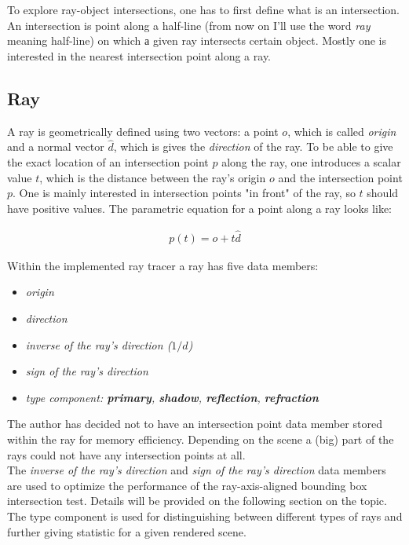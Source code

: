 \documentclass{article}
\begin{document}
\vspace*{\baselineskip}

To explore ray-object intersections, one has to first define what is an intersection. An intersection is point along a half-line (from now on I'll use the word \textit{ray} meaning half-line) on which а given ray intersects certain object. Mostly one is interested in the nearest intersection point along a ray.

\subsection{Ray}

A ray is geometrically defined using two vectors: a point $o$, which is called \textit{origin} and a normal vector $\hat{d}$, which is gives the \textit{direction} of the ray. To be able to give the exact location of an intersection point $p$ along the ray, one introduces a scalar value $t$, which is the distance between the ray's origin $o$ and the intersection point $p$. One is mainly interested in intersection points "in front" of the ray, so $t$ should have positive values. The parametric equation for a point along a ray looks like: \cite{rftgu}

\begin{align}
	p(t) = o + t\hat{d}
\end{align}

Within the implemented ray tracer a ray has five data members: 
\begin{itemize}
	\itemsep0em 	%
	\item \textit{origin}
	\item \textit{direction}
	\item \textit{inverse of the ray's direction ($1 / \hat{d}$)}
	\item \textit{sign of the ray's direction}
	\item \textit{type component: \textbf{primary}, \textbf{shadow}, \textbf{reflection}, \textbf{refraction}}
\end{itemize}

\vspace*{\baselineskip}

The author has decided not to have an intersection point data member stored within the ray for memory efficiency. Depending on the scene a (big) part of the rays could not have any intersection points at all. \\
The \textit{inverse of the ray's direction} and \textit{sign of the ray's direction} data members are used to optimize the performance of the ray-axis-aligned bounding box intersection test. Details will be provided on the following section on the topic.\\
The type component is used for distinguishing between different types of rays and further giving statistic for a given rendered scene.
\end{document}
